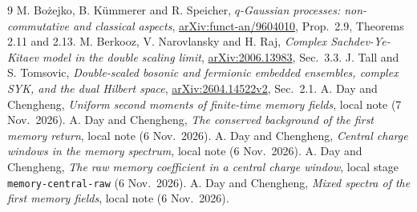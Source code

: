 \documentclass[11pt,a4paper]{article}
\begin{document}
\begin{thebibliography}{9}\small
{} M. Bo\.{z}ejko, B. K\"ummerer and R. Speicher,
\emph{$q$-Gaussian processes: non-commutative and classical aspects},
\href{https://arxiv.org/abs/funct-an/9604010}{arXiv:funct-an/9604010},
Prop.~2.9, Theorems 2.11 and 2.13.
 M. Berkooz, V. Narovlansky and H. Raj,
\emph{Complex Sachdev-Ye-Kitaev model in the double scaling limit},
\href{https://arxiv.org/abs/2006.13983}{arXiv:2006.13983}, Sec.~3.3.
 J. Tall and S. Tomsovic,
\emph{Double-scaled bosonic and fermionic embedded ensembles,
complex SYK, and the dual Hilbert space},
\href{https://arxiv.org/abs/2604.14522}{arXiv:2604.14522v2}, Sec.~2.1.
 A. Day and Chengheng,
\emph{Uniform second moments of finite-time memory fields}, local note (7 Nov.~2026).
 A. Day and Chengheng,
\emph{The conserved background of the first memory return}, local note (6 Nov.~2026).
 A. Day and Chengheng,
\emph{Central charge windows in the memory spectrum}, local note (6 Nov.~2026).
 A. Day and Chengheng,
\emph{The raw memory coefficient in a central charge window}, local stage
\texttt{memory-central-raw} (6 Nov.~2026).
 A. Day and Chengheng,
\emph{Mixed spectra of the first memory fields}, local note (6 Nov.~2026).
\end{thebibliography}
\end{document}
